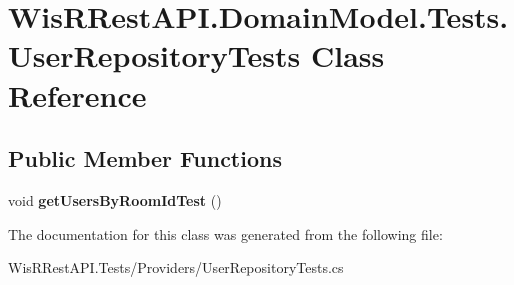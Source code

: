 \hypertarget{class_wis_r_rest_a_p_i_1_1_domain_model_1_1_tests_1_1_user_repository_tests}{}\section{Wis\+R\+Rest\+A\+P\+I.\+Domain\+Model.\+Tests.\+User\+Repository\+Tests Class Reference}
\label{class_wis_r_rest_a_p_i_1_1_domain_model_1_1_tests_1_1_user_repository_tests}
\subsection*{Public Member Functions}
\begin{DoxyCompactItemize}
\item 
\hypertarget{class_wis_r_rest_a_p_i_1_1_domain_model_1_1_tests_1_1_user_repository_tests_a526fa2db9749190a29117b426482e71e}{}void {\bfseries get\+Users\+By\+Room\+Id\+Test} ()\label{class_wis_r_rest_a_p_i_1_1_domain_model_1_1_tests_1_1_user_repository_tests_a526fa2db9749190a29117b426482e71e}

\end{DoxyCompactItemize}


The documentation for this class was generated from the following file\+:\begin{DoxyCompactItemize}
\item 
Wis\+R\+Rest\+A\+P\+I.\+Tests/\+Providers/User\+Repository\+Tests.\+cs\end{DoxyCompactItemize}
